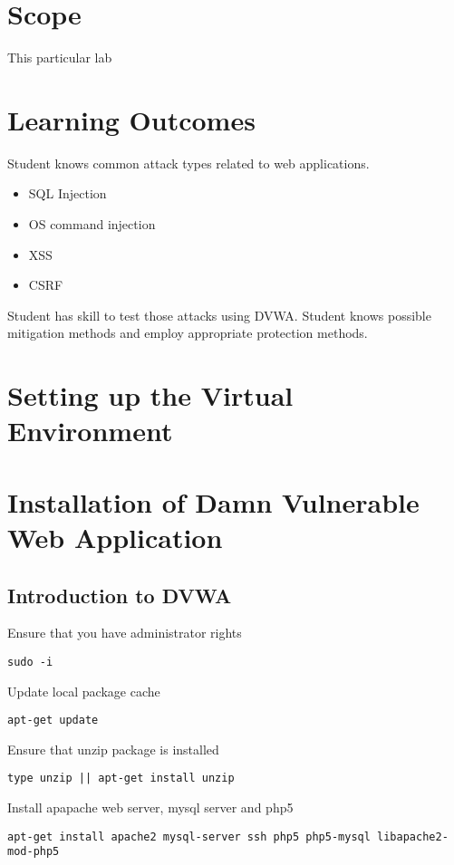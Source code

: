 \section{Scope}
This particular lab 
\section{Learning Outcomes}
Student knows common attack types related to web applications.
\begin{itemize}
	\item SQL Injection
	\item OS command injection
	\item  \gls{XSS}
	\item  \gls{CSRF}
\end{itemize} Student has skill to test those attacks using \gls{DVWA}.
Student knows possible mitigation methods and employ appropriate protection methods.
\section{Setting up the Virtual Environment}
\section{Installation of Damn Vulnerable Web Application}
\subsection{Introduction to DVWA}

Ensure that you have administrator rights
\begin{verbatim}
sudo -i
\end{verbatim}

Update local package cache
\begin{verbatim}
apt-get update
\end{verbatim}


Ensure that unzip package is installed
\begin{verbatim}
type unzip || apt-get install unzip
\end{verbatim}

Install apapache web server, mysql server and php5
\begin{verbatim}
apt-get install apache2 mysql-server ssh php5 php5-mysql libapache2-mod-php5
\end{verbatim}


